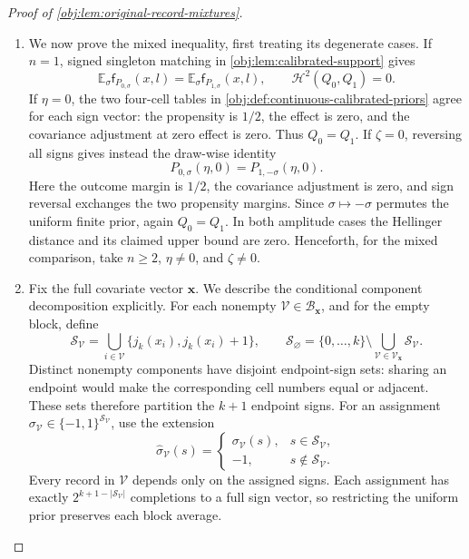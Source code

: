 \documentclass[11pt]{article}
\begin{document}
\begin{proof}[Proof of \cref{obj:lem:original-record-mixtures}]
\begin{enumerate}
\item We now prove the mixed inequality, first treating its degenerate
cases. If \(n=1\), signed singleton matching in
\cref{obj:lem:calibrated-support} gives
\[
\mathbb E_\sigma\mathsf f_{P_{0,\sigma}}(x,l)
=\mathbb E_\sigma\mathsf f_{P_{1,\sigma}}(x,l),
\qquad
\mathcal H^2(Q_0,Q_1)=0.
\]
If \(\eta=0\), the two four-cell tables in
\cref{obj:def:continuous-calibrated-priors} agree for each sign vector:
the propensity is \(1/2\), the effect is zero, and the covariance
adjustment at zero effect is zero. Thus \(Q_0=Q_1\).
If \(\zeta=0\), reversing all signs gives instead the draw-wise identity
\[
P_{0,\sigma}(\eta,0)=P_{1,-\sigma}(\eta,0).
\]
Here the outcome margin is \(1/2\), the covariance adjustment is zero,
and sign reversal exchanges the two propensity margins. Since
\(\sigma\mapsto-\sigma\) permutes the uniform finite prior, again
\(Q_0=Q_1\). In both amplitude cases the Hellinger distance and its
claimed upper bound are zero. Henceforth, for the mixed comparison,
take \(n\ge2\), \(\eta\ne0\), and \(\zeta\ne0\).

\item Fix the full covariate vector \(\mathbf x\). We describe the
conditional component decomposition explicitly. For each nonempty
\(\mathcal V\in\mathscr B_{\mathbf x}\), and for the empty block, define
\[
\mathscr S_{\mathcal V}
=\bigcup_{i\in\mathcal V}\{j_k(x_i),j_k(x_i)+1\},
\qquad
\mathscr S_{\varnothing}
=\{0,\ldots,k\}\setminus
\bigcup_{\mathcal V\in\mathscr V_{\mathbf x}}\mathscr S_{\mathcal V}.
\]
Distinct nonempty components have disjoint endpoint-sign sets: sharing
an endpoint would make the corresponding cell numbers equal or
adjacent. These sets therefore partition the \(k+1\) endpoint signs.
For an assignment
\(\sigma_{\mathcal V}\in\{-1,1\}^{\mathscr S_{\mathcal V}}\), use the
extension
\[
\widehat\sigma_{\mathcal V}(s)
=
\begin{cases}
\sigma_{\mathcal V}(s),&s\in\mathscr S_{\mathcal V},\\
-1,&s\notin\mathscr S_{\mathcal V}.
\end{cases}
\]
Every record in \(\mathcal V\) depends only on the assigned signs.
Each assignment has exactly \(2^{k+1-|\mathscr S_{\mathcal V}|}\)
completions to a full sign vector, so restricting the uniform prior
preserves each block average.


\end{enumerate}
\end{proof}
\end{document}
